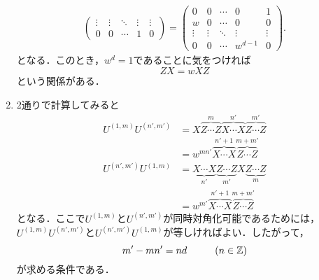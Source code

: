 \documentclass[a4paper,pdflatex,ja=standard]{bxjsarticle}
\begin{document}
\begin{enumerate}
\begin{gather}
\begin{pmatrix}
      \vdots & \vdots & \ddots & \vdots & \vdots \\
      0 & 0 & \cdots & 1 & 0
    \end{pmatrix}
    =    
    \begin{pmatrix}
      0 & 0 & \cdots & 0 & 1 \\
      w & 0 & \cdots & 0 & 0 \\
      \vdots & \vdots & \ddots & \vdots & \vdots \\
      0 & 0 & \cdots & w^{d-1} & 0
    \end{pmatrix}
    .
    \nonumber
  \end{gather}
  となる．このとき，$w^{d}=1$であることに気をつければ
  \begin{equation}
    ZX
    =
    wXZ
  \end{equation}
  という関係がある．

  \item 
  2通りで計算してみると
  \begin{align}
    U^{(1,m)}U^{(n',m')}
    &=
    X\overbrace{Z\cdots Z}^{m}\overbrace{X\cdots X}^{n'}\overbrace{Z\cdots Z}^{m'}
    \nonumber
    \\
    &=
    w^{mn'}\overbrace{X\cdots X}^{n'+1}\overbrace{Z\cdots Z}^{m+m'}
    \\
    U^{(n',m')}U^{(1,m)}
    &=
    \underbrace{X\cdots X}_{n'}\underbrace{Z\cdots Z}_{m'}X\underbrace{Z\cdots Z}_{m}
    \nonumber
    \\
    \nonumber
    &=
    w^{m'}\overbrace{X\cdots X}^{n'+1}\overbrace{Z\cdots Z}^{m+m'}
  \end{align}
  となる．ここで$U^{(1,m)}$と$U^{(n',m')}$が同時対角化可能であるためには，$U^{(1,m)}U^{(n',m')}$と$U^{(n',m')}U^{(1,m)}$が等しければよい．したがって，
  \begin{equation}
    m'-mn'
    =
    nd
    \hspace*{1cm}
    (n\in\mathbb{Z})
  \end{equation}
  が求める条件である．
  

\end{enumerate}
\end{document}
